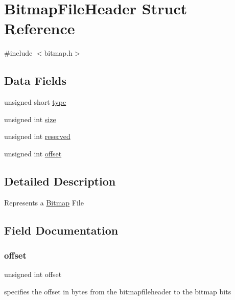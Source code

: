 \hypertarget{struct_bitmap_file_header}{}\section{Bitmap\+File\+Header Struct Reference}
\label{struct_bitmap_file_header}


{\ttfamily \#include $<$bitmap.\+h$>$}

\subsection*{Data Fields}
\begin{DoxyCompactItemize}
\item 
unsigned short \hyperlink{struct_bitmap_file_header_aa929142c5ddf34cf0915c97a617a1a63}{type}
\item 
unsigned int \hyperlink{struct_bitmap_file_header_aac913b3a1f6ef005d66bf7a84428773e}{size}
\item 
unsigned int \hyperlink{struct_bitmap_file_header_a05d5cbcb44f437341bd9fa37d589aced}{reserved}
\item 
unsigned int \hyperlink{struct_bitmap_file_header_a29b5297d3393519050e3126c4cb07c1c}{offset}
\end{DoxyCompactItemize}


\subsection{Detailed Description}
Represents a \hyperlink{struct_bitmap}{Bitmap} File 

\subsection{Field Documentation}
\mbox{\label{struct_bitmap_file_header_a29b5297d3393519050e3126c4cb07c1c}} 
\subsubsection{\texorpdfstring{offset}{offset}}
{\footnotesize\ttfamily unsigned int offset}

specifies the offset in bytes from the bitmapfileheader to the bitmap bits \mbox{\label{struct_bitmap_file_header_a05d5cbcb44f437341bd9fa37d589aced}} 
